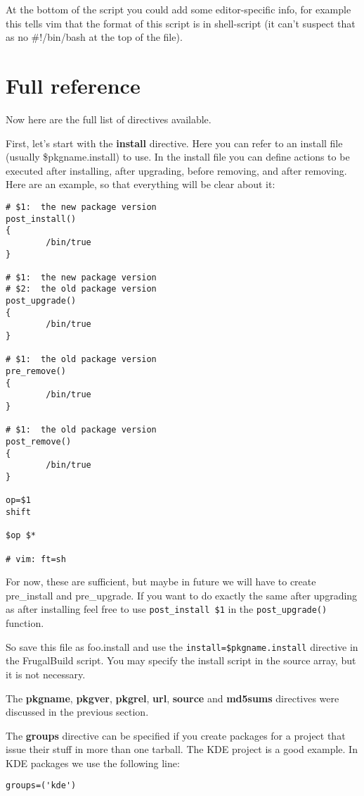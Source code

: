At the bottom of the script you could add some editor-specific info, for example this tells vim that the format of this script is in shell-script (it can't suspect that as no #!/bin/bash at the top of the file).

\section{Full reference}

Now here are the full list of directives available.

First, let's start with the \textbf{install} directive. Here you can refer to an install file (usually \$pkgname.install) to use. In the install file you can define actions to be executed after installing, after upgrading, before removing, and after removing. Here are an example, so that everything will be clear about it:

\begin{verbatim}
# $1:  the new package version
post_install()
{
        /bin/true
}

# $1:  the new package version
# $2:  the old package version
post_upgrade()
{
        /bin/true
}

# $1:  the old package version
pre_remove()
{
        /bin/true
}

# $1:  the old package version
post_remove()
{
        /bin/true
}

op=$1
shift

$op $*

# vim: ft=sh
\end{verbatim}

For now, these are sufficient, but maybe in future we will have to create pre\_install and pre\_upgrade. If you want to do exactly the same after upgrading as after installing feel free to use {\tt post\_install \$1} in the {\tt post\_upgrade()} function.

So save this file as foo.install and use the {\tt install=\$pkgname.install} directive in the FrugalBuild script.
You may specify the install script in the source array, but it is not necessary.

The \textbf{pkgname}, \textbf{pkgver}, \textbf{pkgrel}, \textbf{url}, \textbf{source} and \textbf{md5sums} directives were discussed in the previous section.

The \textbf{groups} directive can be specified if you create packages for a project that issue their stuff in more than one tarball. The KDE project is a good example. In KDE packages we use the following line:
\begin{verbatim}
groups=('kde')
\end{verbatim}

